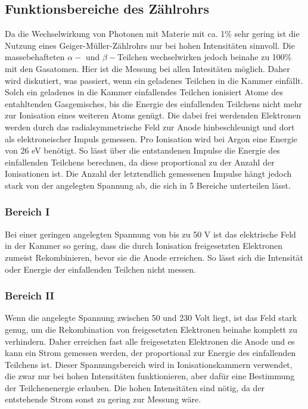 \documentclass[titlepage = firstcover]{scrartcl}
\begin{document}
        \subsection{Funktionsbereiche des Zählrohrs}
            Da die Wechselwirkung von Photonen mit Materie mit ca. 1\% sehr gering ist die Nutzung eines Geiger-Müller-Zählrohrs nur bei hohen Intensitäten sinnvoll. Die massebehafteten $\alpha-$ und
            $\beta-$Teilchen wechselwirken jedoch beinahe zu 100\% mit den Gasatomen. Hier ist die Messung bei allen Intesitäten möglich. Daher wird diskutiert, was passiert, wenn ein geladenes
            Teilchen in die Kammer einfällt.
            Solch ein geladenes in die Kammer einfallendes Teilchen ionisiert Atome des entahltenden Gasgemisches, bis die Energie des einfallenden Teilchens nicht mehr zur Ionisation eines weiteren
            Atoms genügt. Die dabei frei werdenden Elektronen werden durch das radialsymmetrische Feld zur Anode hinbeschleunigt und dort als elektroneischer Impuls gemessen. Pro Ionisation 
            wird bei Argon eine Energie von 26 eV benötigt. So lässt über die entstandenen Impulse die Energie des einfallenden Teilchens berechnen, da diese proportional zu der Anzahl der
            Ionisationen ist. Die Anzahl der letztendlich gemessenen Impulse hängt jedoch stark von der angelegten Spannung ab, die sich in 5 Bereiche unterteilen lässt.

            \newpage
            \subsubsection*{Bereich I}
                Bei einer geringen angelegten Spannung von bis zu 50 V ist das elektrische Feld in der Kammer so gering, dass die durch Ionisation freigesetzten Elektronen zumeist Rekombinieren, bevor
                sie die Anode erreichen. So lässt sich die Intensität oder Energie der einfallenden Teilchen nicht messen.

            \subsubsection*{Bereich II}
                Wenn die angelegte Spannung zwischen 50 und 230 Volt liegt, ist das Feld stark genug, um die Rekombination von freigesetzten Elektronen beinahe komplett zu verhindern. Daher erreichen
                fast alle freigesetzten Elektronen die Anode und es kann ein Strom gemessen werden, der proportional zur Energie des einfallenden Teilchens ist. Dieser Spannungsbereich wird in
                Ionisationskammern verwendet, die zwar nur bei hohen Intensitäten funktionieren, aber dafür eine Bestimmung der Teilchenenergie erlauben. Die hohen Intensitäten sind nötig, da der 
                entstehende Strom sonst zu gering zur Messung wäre.
\end{document}

